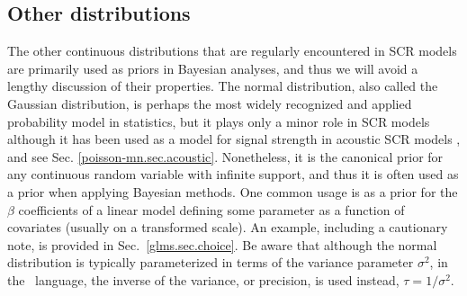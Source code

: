 \subsection{Other distributions}

The other continuous distributions that are regularly encountered in SCR
models are
primarily used as priors in Bayesian analyses, and thus we will avoid
a lengthy discussion of their properties. %
The normal distribution, also called the Gaussian
distribution, is perhaps the most widely recognized and applied probability model in
statistics, but it plays only a minor role in SCR models although it
has been used as a model for signal strength in acoustic SCR models
\citep{efford_etal:2009ecol,dawson_efford:2009}, and see Sec. \ref{poisson-mn.sec.acoustic}. %
Nonetheless, it
is the canonical prior for any continuous random variable with
infinite support, and thus it is often used as a prior when applying Bayesian
methods. One common usage is as a prior for the $\beta$
coefficients of a linear model defining some parameter as a function
of covariates (usually on a transformed scale). An example, including a
cautionary note, is provided in Sec.~\ref{glms.sec.choice}.
Be aware that although the normal distribution is typically
parameterized in terms of the variance parameter $\sigma^2$, in
the \bugs~language, the inverse of the variance, or precision, is used
instead, $\tau = 1/\sigma^2$.

